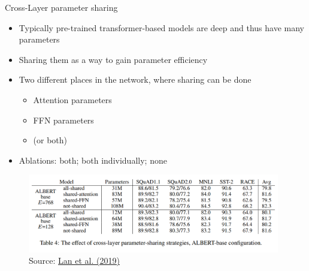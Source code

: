 
\begin{frame}{Cross-Layer parameter sharing}

\vfill

	\begin{itemize}
		\item Typically pre-trained transformer-based models are deep and thus have many parameters
		\item Sharing them as a way to gain parameter efficiency
		\item Two different places in the network, where sharing can be done
			\begin{itemize}
				\item Attention parameters
				\item FFN parameters
				\item (or both)
			\end{itemize}
		\item Ablations: both; both individually; none
	\end{itemize}

	\begin{figure}
		\centering
		\includegraphics[width = 11cm]{figure/albert-param-sharing.png}\\ 
		\footnotesize{Source:} \href{https://arxiv.org/pdf/1907.11942.pdf}{\footnotesize Lan et al. (2019)}
	\end{figure}

\vfill

\end{frame}


